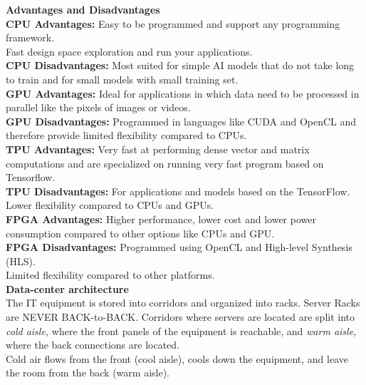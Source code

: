 \documentclass[10pt, oneside]{article}
\begin{document}
\textbf{Advantages and Disadvantages}\\
\textbf{CPU Advantages:}
Easy to be programmed and support any programming framework.\\ Fast design space exploration
and run your applications.\\
\textbf{CPU Disadvantages:}
Most suited for simple AI models that do not take long to train and for small models with small training set.\\
\textbf{GPU Advantages:}
Ideal for applications in which data need to be processed in parallel like the pixels of images or videos.\\
\textbf{GPU Disadvantages:}
Programmed in languages like CUDA and OpenCL and therefore provide limited flexibility compared to CPUs.\\
\textbf{TPU Advantages:}
Very fast at performing dense vector and matrix computations and are specialized on running very fast program based on Tensorflow.\\
\textbf{TPU Disadvantages:}
For applications and models based on the TensorFlow. Lower flexibility compared to CPUs and GPUs.\\
\textbf{FPGA Advantages:}
Higher performance, lower cost and lower power consumption compared to other options like CPUs and GPU.\\
\textbf{FPGA Disadvantages:}
Programmed using OpenCL and High-level Synthesis (HLS).\\Limited flexibility compared to
other platforms.\\
\newline
\textbf{Data-center architecture}\\
The IT equipment is stored into corridors and organized into racks.
Server Racks are NEVER BACK-to-BACK. Corridors where servers are located are split into \emph{cold aisle,} 
where the front panels of the equipment is reachable, and \emph{warm aisle,}
where the back connections are located.\\ Cold air flows from the front (cool aisle), cools down the equipment, and leave the room from the back (warm aisle).


\newpage

\end{document}
